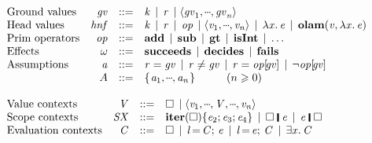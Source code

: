 \begin{figure}[t]
$$\begin{array}{l}
\begin{array}{lrcl@{}}
      \text{Ground values} & \ensuremath{\Varid{gv}} & ::= & \ensuremath{\Varid{k}} \vb \ensuremath{\Varid{r}} \vb \ensuremath{\langle\Varid{gv}_{\mathrm{1}},\mydots,\Varid{gv}_{\Varid{n}}\rangle} \\
      \text{Head values} & \hnf & ::= & \ensuremath{\Varid{k}} \vb \ensuremath{\Varid{r}}  \vb \ensuremath{\Varid{op}} \vb \ensuremath{\langle\Varid{v}_{\mathrm{1}},\mydots,\Varid{v}_{\Varid{n}}\rangle} \vb \ensuremath{\lambda\Varid{x} .\,\Varid{e}}
             \vb \ensuremath{\textbf{olam}(\Varid{v},\lambda\Varid{x} .\,\Varid{e})}\\
      \text{Prim operators} & \ensuremath{\Varid{op}}  & ::= & \ensuremath{\textbf{add}} \vb \ensuremath{\textbf{sub}} \vb \ensuremath{\textbf{gt}} \vb \ensuremath{\textbf{isInt}} \vb \ldots \\
      \text{Effects} & \ensuremath{\omega} & ::= & \ensuremath{\textbf{succeeds}} \vb \ensuremath{\textbf{decides}} \vb \ensuremath{\textbf{fails}}  \\
      \text{Assumptions} & \ensuremath{\Varid{a}} & ::= & \ensuremath{\Varid{r}\mathrel{=}\Varid{gv}} \vb \ensuremath{\Varid{r}\not=\Varid{gv}} \vb \ensuremath{\Varid{r}\mathrel{=}\Varid{op} [\!\Varid{gv}]} \vb \ensuremath{\neg\Varid{op} [\!\Varid{gv}]} \\
      & \ensuremath{A} & ::= & \ensuremath{\{\mskip1.5mu \Varid{a}_{\mathrm{1}},\mydots,\Varid{a}_{\Varid{n}}\mskip1.5mu\}}   \hspace{1cm} (n \geq 0)
\end{array}
\\ \\
\begin{array}{lrcl}
\text{Value contexts}  & \ensuremath{\Conid{V}} & ::= & \hole \vb \ensuremath{\langle{}\Varid{v}_{\mathrm{1}},\mydots,\Conid{V},\mydots,\Varid{v}_{\Varid{n}}\rangle}\\
\text{Scope contexts}  & \ensuremath{\Conid{SX}} & ::= & \ensuremath{\textbf{iter}(\hole)\{\Varid{e}_{\mathrm{2}};\Varid{e}_{\mathrm{3}};\Varid{e}_{\mathrm{4}}\}} \vb \ensuremath{\hole\;\rule[-0.1em]{0.15em}{0.75em}\;\Varid{e}} \vb \ensuremath{\Varid{e}\;\rule[-0.1em]{0.15em}{0.75em}\;\hole} \\
\text{Evaluation contexts}  & \ensuremath{\Conid{C}} & ::= & \ensuremath{\hole} \vb \ensuremath{\Varid{l}\hspace{-0.14em}=\hspace{-0.14em}\Conid{C};\,\Varid{e}} \vb \ensuremath{\Varid{l}\hspace{-0.14em}=\hspace{-0.14em}\Varid{e};\,\Conid{C}} \vb \ensuremath{\exists\Varid{x}.\,\Conid{C}} \\

\end{array}
\end{array}$$
\end{figure}
